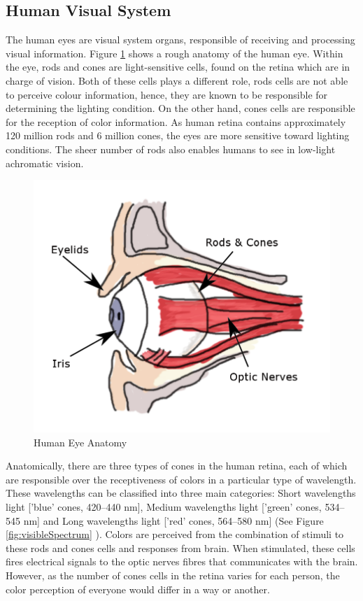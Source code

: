 \subsection{Human Visual System}
\label{section:eyes}
The human eyes are visual system organs, responsible of receiving and processing visual information. Figure \ref{fig:eyes} shows a rough anatomy of the human eye. Within the eye, rods and cones are light-sensitive cells, found on the retina which are in charge of vision. Both of these cells plays a different role, rods cells are not able to perceive colour information, hence, they are known to be responsible for determining the lighting condition. On the other hand, cones cells are responsible for the reception of color information. As human retina contains approximately 120 million rods and 6 million cones, the eyes are more sensitive toward lighting conditions. The sheer number of rods also enables humans to see in low-light achromatic vision.   


\begin{figure}[hbt!]\centering
\includegraphics[width=.5\textwidth]{image/lit/rodsandconscolored.png}
\caption{Human Eye Anatomy}
\label{fig:eyes}
\end{figure}

Anatomically, there are three types of cones in the human retina, each of which are responsible over the receptiveness of colors in a particular type of wavelength. These wavelengths can be classified into three main categories: Short wavelengths light ['blue' cones, 420–440 nm], Medium  wavelengths light ['green' cones, 534–545 nm] and Long wavelengths light ['red' cones, 564–580 nm] (See Figure \ref{fig:visibleSpectrum} \cite{eyespectrum}). Colors are perceived from the combination of stimuli to these rods and cones cells and responses from brain. When stimulated, these cells fires electrical signals to the optic nerves fibres that communicates with the brain. However, as the number of cones cells in the retina varies for each person, the color perception of everyone would differ in a way or another. 


